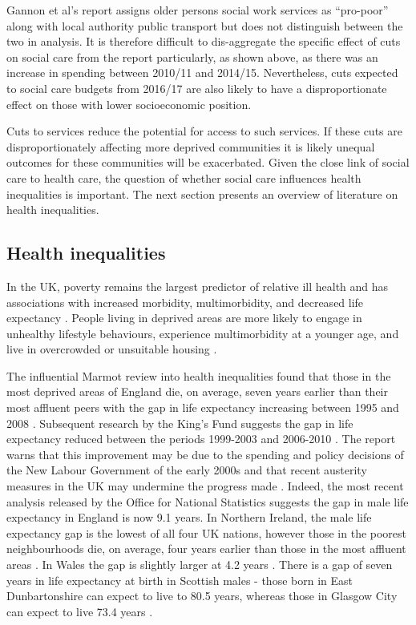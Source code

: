 \documentclass[12pt,]{report}
\begin{document}
Gannon et al's report \citeyearpar{RN235} assigns older persons social
work services as ``pro-poor'' along with local authority public
transport but does not distinguish between the two in analysis. It is
therefore difficult to dis-aggregate the specific effect of cuts on
social care from the report particularly, as shown above, as there was
an increase in spending between 2010/11 and 2014/15. Nevertheless, cuts
expected to social care budgets from 2016/17 \citep{RN447} are also
likely to have a disproportionate effect on those with lower
socioeconomic position.

Cuts to services reduce the potential for access to such services. If
these cuts are disproportionately affecting more deprived communities it
is likely unequal outcomes for these communities will be exacerbated.
Given the close link of social care to health care, the question of
whether social care influences health inequalities is important. The
next section presents an overview of literature on health inequalities.

\subsection{Health inequalities}\label{subsec:health-inequals}

In the UK, poverty remains the largest predictor of relative ill health
and has associations with increased morbidity, multimorbidity, and
decreased life expectancy \citep{RN37}. People living in deprived areas
are more likely to engage in unhealthy lifestyle behaviours, experience
multimorbidity at a younger age, and live in overcrowded or unsuitable
housing \citep{RN37, RN311}.

The influential Marmot review into health inequalities found that those
in the most deprived areas of England die, on average, seven years
earlier than their most affluent peers \citep{RN312} with the gap in
life expectancy increasing between 1995 and 2008 \citep{RN313}.
Subsequent research by the King's Fund suggests the gap in life
expectancy reduced between the periods 1999-2003 and 2006-2010
\citep{RN314}. The report warns that this improvement may be due to the
spending and policy decisions of the New Labour Government of the early
2000s and that recent austerity measures in the UK may undermine the
progress made \citep{RN314}. Indeed, the most recent analysis released
by the Office for National Statistics \citeyearpar{RN375} suggests the
gap in male life expectancy in England is now 9.1 years. In Northern
Ireland, the male life expectancy gap is the lowest of all four UK
nations, however those in the poorest neighbourhoods die, on average,
four years earlier than those in the most affluent areas \citep{RN375}.
In Wales the gap is slightly larger at 4.2 years \citep{RN375}. There is
a gap of seven years in life expectancy at birth in Scottish males -
those born in East Dunbartonshire can expect to live to 80.5 years,
whereas those in Glasgow City can expect to live 73.4 years
\citep{RN375}.
\end{document}
